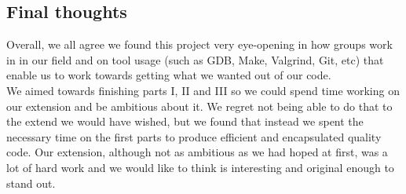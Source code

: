 \documentclass[11pt]{article}
\begin{document}
\subsection{Final thoughts}
Overall, we all agree we found this project very eye-opening in how 
groups work in in our field and on tool usage (such as GDB, Make,
Valgrind, Git, etc) that enable us to work towards getting what we 
wanted out of our code. \\
We aimed towards finishing parts I, II and III so we could spend time
working on our extension and be ambitious about it. We regret not being
able to do that to the extend we would have wished, but we found that 
instead we spent the necessary time on the first parts to produce 
efficient and encapsulated quality code. Our extension, although not
as ambitious as we had hoped at first, was a lot of hard work and we 
would like to think is interesting and original enough to stand out.
\end{document}

